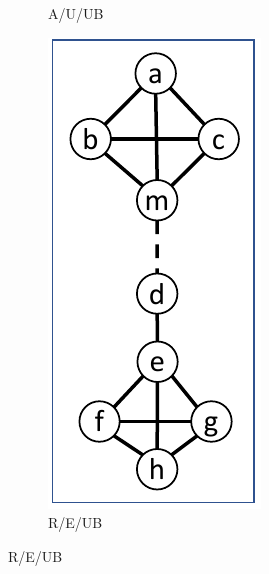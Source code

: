 \documentclass{article}
\begin{document}
\begin{figure}[t]
\begin{subfigure}{0.09\textwidth}
            \caption{A/U/UB}
            \label{fig:distance1_util_unsafe_add_UB}
        \end{subfigure}
                \hfill
                \begin{subfigure}{0.09\textwidth}
            \centering
            \includegraphics[page=5,width=\textwidth]{Graphs/Distance_1_paper.pdf}
            \caption{R/E/UB}
            \label{fig:distance1_egal_ub_any}
        \end{subfigure}
    

\end{figure}
\end{document}

